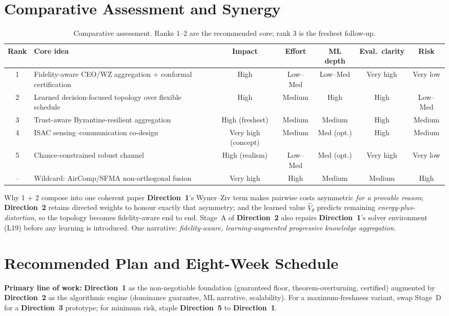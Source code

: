 \documentclass[11pt,a4paper]{article}
\newcommand{\Dir}[1]{\textcolor{accent}{\textbf{Direction~#1}}}
\begin{document}
\section{Comparative Assessment and Synergy}
\begin{table}[h]
\centering\footnotesize
\renewcommand{\arraystretch}{1.3}
\begin{tabular}{@{}c p{4.6cm} c c c c c@{}}
\toprule
\textbf{Rank} & \textbf{Core idea} & \textbf{Impact} & \textbf{Effort} & \textbf{ML depth} & \textbf{Eval.\ clarity} & \textbf{Risk} \\
\midrule
1 & Fidelity-aware CEO/WZ aggregation + conformal certification & High & Low--Med & Low--Med & Very high & Very low \\
2 & Learned decision-focused topology over flexible schedule & High & Medium & High & High & Low--Med \\
3 & Trust-aware Byzantine-resilient aggregation & High (freshest) & Medium & Medium & High & Medium \\
4 & ISAC sensing--communication co-design & Very high (concept) & Medium & Med (opt.) & High & Medium \\
5 & Chance-constrained robust channel & High (realism) & Low--Med & Med (opt.) & Very high & Very low \\
-- & Wildcard: AirComp/SFMA non-orthogonal fusion & Very high & High & Medium & Medium & High \\
\bottomrule
\end{tabular}
\caption{Comparative assessment. Ranks 1--2 are the recommended core; rank 3 is the freshest follow-up.}
\label{tab:compare}
\end{table}

\begin{infobox}{Why 1 + 2 compose into one coherent paper}
\Dir{1}'s Wyner--Ziv term makes pairwise costs asymmetric \emph{for a provable reason}; \Dir{2} retains directed weights to honour exactly that asymmetry; and the learned value $\hat V_\theta$ predicts remaining \emph{energy-plus-distortion}, so the topology becomes fidelity-aware end to end. Stage~A of \Dir{2} also repairs \Dir{1}'s solver environment (L19) before any learning is introduced. One narrative: \emph{fidelity-aware, learning-augmented progressive knowledge aggregation}.
\end{infobox}

\section{Recommended Plan and Eight-Week Schedule}
\label{sec:plan}
\textbf{Primary line of work:} \Dir{1} as the non-negotiable foundation (guaranteed floor, theorem-overturning, certified) augmented by \Dir{2} as the algorithmic engine (dominance guarantee, ML narrative, scalability). For a maximum-freshness variant, swap Stage~D for a \Dir{3} prototype; for minimum risk, staple \Dir{5} to \Dir{1}.
\end{document}

